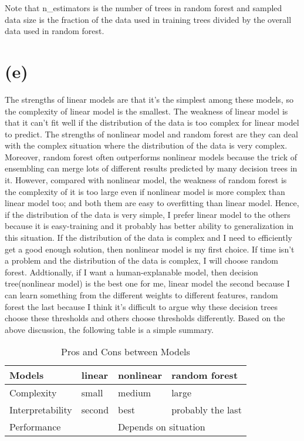 \documentclass[12pt,a4paper]{article}
\begin{document}
Note that n\_estimators is the number of trees in random forest and sampled data size is the fraction of the data used in training trees divided by the overall data used in random forest.

\newpage
\section*{(e)}
The strengths of linear models are that it's the simplest among these models, so the complexity of linear model is the smallest. The weakness of linear model is that it can't 
fit well if the distribution of the data is too complex for linear model to predict. The strengths of nonlinear model and random forest are they can deal with the complex situation where
the distribution of the data is very complex. Moreover, random forest often outperforms nonlinear models because the trick of ensembling can merge lots of different results predicted by
many decision trees in it. However, compared with nonlinear model, the weakness of random forest is the complexity of it is too large even if nonlinear model is more complex than linear model too;
and both them are easy to overfitting than linear model. Hence, if the distribution of the data is very simple, I prefer linear model to the others because it
is easy-training and it probably has better ability to generalization in this situation. If the distribution of the data is complex and I need to efficiently get a good enough solution, 
then nonlinear model is my first choice. If time isn't a problem and the distribution of the data is complex, I will choose random forest. Addtionally, if I want a human-explanable model,
then decision tree(nonlinear model) is the best one for me, linear model the second because I can learn something from the different weights to different features, random forest the last because
I think it's difficult to argue why these decision trees choose these thresholds and others choose thresholds differently. Based on the above discussion, the following table is a
simple summary.
\begin{table}[htbp]
    \centering
    \caption{Pros and Cons between Models}
    \label{label5}
    \begin{tabular}[t]{llll}
    \hline
    Models & linear & nonlinear & random forest\\
    \hline
    Complexity & small & medium & large \\
    Interpretability & second & best & probably the last \\
    Performance & \multicolumn{3}{c}{Depends on situation}\\
    \hline
    \end{tabular}
\end{table}
\end{document}

